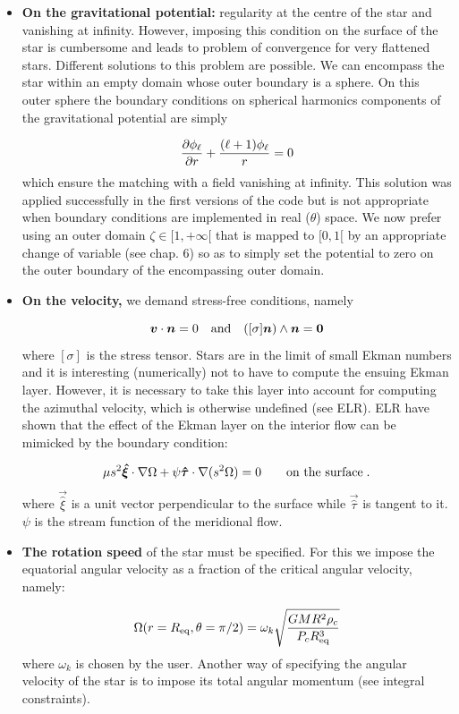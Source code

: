 \begin{itemize}
\item {\bf On the gravitational potential:} regularity at the centre of the
star and vanishing at infinity. However, imposing this condition on the
surface of the star is cumbersome and leads to problem of convergence
for very flattened stars. Different solutions to this problem are
possible. We can encompass the star within an empty
domain whose outer boundary is a sphere. On this outer sphere the
boundary conditions on spherical harmonics components of the
gravitational potential are simply

\[ 
\frac{\partial \phi_\ell}{\partial r}+\frac{(\ell+1)\phi_\ell}{r}=0
\]
which ensure the matching with a field vanishing at infinity. This
solution was applied successfully in the first versions of the code but
is not appropriate when boundary conditions are implemented in real
($\theta$) space. We now prefer using an outer domain $\zeta\in
[1,+\infty[$ that is mapped to $[0,1[$ by an appropriate change of
variable (see chap. 6) so as to simply set the potential to zero on the
outer boundary of the encompassing outer domain.

\item {\bf On the velocity,} we demand stress-free conditions, namely

\[ \vv\cdot \vn =0 \quad {\rm and}\quad ([\sigma]\vn)\wedge\vn =\vzero
\]
where $[\sigma]$ is the stress tensor. Stars are in the limit of
small Ekman numbers and it is interesting (numerically) not to have to
compute the ensuing Ekman layer. However, it is necessary to take this
layer into account for computing the azimuthal velocity, which
is otherwise undefined (see ELR).
ELR have shown that the effect of the Ekman layer on
the interior flow can be mimicked by the boundary condition:

\begin{equation}
\label{eq:bl}
\mu
s^2\vec{\hat\xi}\cdot\na\Omega+\psi\vec{\hat\tau}\cdot\na(s^2\Omega)=0
\qquad\mbox{on the surface}\;.
\end{equation}
where $\vec{\hat\xi}$ is a unit vector perpendicular to the surface
while $\vec{\hat\tau}$ is tangent to it. $\psi$ is the stream
function of the meridional flow.

\item {\bf The rotation speed} of the star must be specified. For this we
impose the equatorial angular velocity as a fraction of the critical
angular velocity, namely:

\[ \Omega(r=R_{\rm eq},\theta=\pi/2) =
\omega_k\sqrt{\frac{GMR^2\rho_c}{P_cR_{\rm eq}^3}}\]
where $\omega_k$ is chosen by the user. Another way of specifying the
angular velocity of the star is to impose its total angular momentum
(see integral constraints).


\end{itemize}
